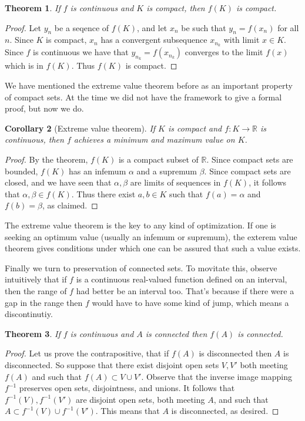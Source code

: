\documentclass[11pt,oneside]{amsbook}
\newcommand{\RR}{\mathbb R}
\theoremstyle{definition}
\theoremstyle{plain}
\newtheorem{thm}{Theorem}[section]
\newtheorem{cor}[thm]{Corollary}
\theoremstyle{definition}
\theoremstyle{remark}
\numberwithin{equation}{section}
\numberwithin{figure}{section}
\begin{document}
\begin{thm}
  If $f$ is continuous and $K$ is compact, then $f(K)$ is compact.
\end{thm}

\begin{proof}
  Let $y_n$ be a seqence of $f(K)$, and let $x_n$ be such that $y_n=f(x_n)$ for all $n$. Since $K$ is compact, $x_n$ has a convergent subsequence $x_{n_k}$ with limit $x\in K$. Since $f$ is continuous we have that $y_{n_k}=f(x_{n_k})$ converges to the limit $f(x)$ which is in $f(K)$. Thus $f(K)$ is compact.
\end{proof}

We have mentioned the extreme value theorem before as an important property of compact sets. At the time we did not have the framework to give a formal proof, but now we do.

\begin{cor}[Extreme value theorem]
  If $K$ is compact and $f\colon K\to\RR$ is continuous, then $f$ achieves a minimum and maximum value on $K$.
\end{cor}

\begin{proof}
  By the theorem, $f(K)$ is a compact subset of $\RR$. Since compact sets are bounded, $f(K)$ has an infemum $\alpha$ and a supremum $\beta$. Since compact sets are closed, and we have seen that $\alpha,\beta$ are limits of sequences in $f(K)$, it follows that $\alpha,\beta\in f(K)$. Thus there exist $a,b\in K$ such that $f(a)=\alpha$ and $f(b)=\beta$, as claimed.
\end{proof}

The extreme value theorem is the key to any kind of optimization. If one is seeking an optimum value (usually an infemum or supremum), the exterem value theorem gives conditions under which one can be assured that such a value exists.

Finally we turn to preservation of connected sets. To movitate this, observe intuitively that if $f$ is a continuous real-valued function defined on an interval, then the range of $f$ had better be an interval too. That's because if there were a gap in the range then $f$ would have to have some kind of jump, which means a discontinutiy. 

\begin{thm}
  If $f$ is continuous and $A$ is connected then $f(A)$ is connected.
\end{thm}

\begin{proof}
  Let us prove the contrapositive, that if $f(A)$ is disconnected then $A$ is disconnected. So suppose that there exist disjoint open sets $V,V'$ both meeting $f(A)$ and such that $f(A)\subset V\cup V'$. Observe that the inverse image mapping $f^{-1}$ preserves open sets, disjointness, and unions. It follows that $f^{-1}(V),f^{-1}(V')$ are disjoint open sets, both meeting $A$, and such that $A\subset f^{-1}(V)\cup f^{-1}(V')$. This means that $A$ is disconnected, as desired.
\end{proof}
\end{document}
